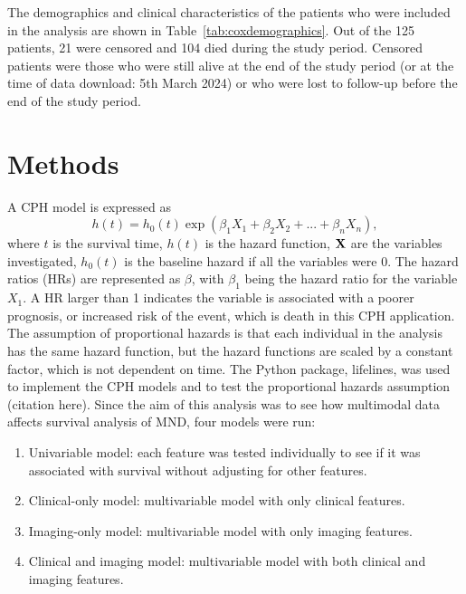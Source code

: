 The demographics and clinical characteristics of the patients who were included in the analysis are shown in Table~\ref{tab:coxdemographics}.
Out of the 125 patients, 21 were censored and 104 died during the study period.
Censored patients were those who were still alive at the end of the study period (or at the time of data download: 5th March 2024) or who were lost to follow-up before the end of the study period.

\section{Methods}

A CPH model is expressed as
\begin{equation}\label{eq:coxhazard}
    h(t) = h_0(t) \exp{(\beta_1 X_1 + \beta_2 X_2 + ... + \beta_n X_n)},
\end{equation}
where $t$ is the survival time, $h(t)$ is the hazard function, $\bold{X}$ are the variables investigated, $h_0(t)$ is the baseline hazard if all the variables were 0.
The hazard ratios (HRs) are represented as $\beta$, with $\beta_1$ being the hazard ratio for the variable $X_1$.
A HR larger than 1 indicates the variable is associated with a poorer prognosis, or increased risk of the event, which is death in this CPH application.
The assumption of proportional hazards is that each individual in the analysis has the same hazard function, but the hazard functions are scaled by a constant factor, which is not dependent on time.
The Python package, lifelines, was used to implement the CPH models and to test the proportional hazards assumption (citation here).
Since the aim of this analysis was to see how multimodal data affects survival analysis of MND, four models were run:
\begin{enumerate}
\setlength\itemsep{-0.5em}
    \item Univariable model: each feature was tested individually to see if it was associated with survival without adjusting for other features.
    \item Clinical-only model: multivariable model with only clinical features.
    \item Imaging-only model: multivariable model with only imaging features.
    \item Clinical and imaging model: multivariable model with both clinical and imaging features.
\end{enumerate}


